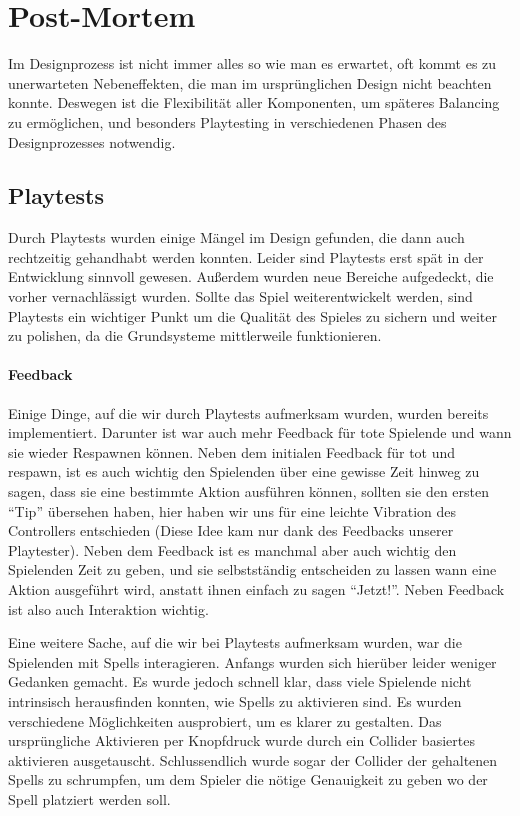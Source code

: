 \chapter{Post-Mortem}

Im Designprozess ist nicht immer alles so wie man es erwartet, oft kommt es zu unerwarteten Nebeneffekten, die man im ursprünglichen Design nicht beachten konnte. Deswegen ist die Flexibilität aller Komponenten, um späteres Balancing zu ermöglichen, und besonders Playtesting in verschiedenen Phasen des Designprozesses notwendig.

\section{Playtests}

Durch Playtests wurden einige Mängel im Design gefunden, die dann auch rechtzeitig gehandhabt werden konnten. Leider sind Playtests erst spät in der Entwicklung sinnvoll gewesen. Außerdem wurden neue Bereiche aufgedeckt, die vorher vernachlässigt wurden. Sollte das Spiel weiterentwickelt werden, sind Playtests ein wichtiger Punkt um die Qualität des Spieles zu sichern und weiter zu polishen, da die Grundsysteme mittlerweile funktionieren.

\subsubsection{Feedback}

Einige Dinge, auf die wir durch Playtests aufmerksam wurden, wurden bereits implementiert. Darunter ist war auch mehr Feedback für tote Spielende und wann sie wieder Respawnen können. Neben dem initialen Feedback für tot und respawn, ist es auch wichtig den Spielenden über eine gewisse Zeit hinweg zu sagen, dass sie eine bestimmte Aktion ausführen können, sollten sie den ersten "`Tip"' übersehen haben, hier haben wir uns für eine leichte Vibration des Controllers entschieden (Diese Idee kam nur dank des Feedbacks unserer Playtester). Neben dem Feedback ist es manchmal aber auch wichtig den Spielenden Zeit zu geben, und sie selbstständig entscheiden zu lassen wann eine Aktion ausgeführt wird, anstatt ihnen einfach zu sagen "`Jetzt!"'. Neben Feedback ist also auch Interaktion wichtig.

Eine weitere Sache, auf die wir bei Playtests aufmerksam wurden, war die Spielenden mit Spells interagieren. Anfangs wurden sich hierüber leider weniger Gedanken gemacht. Es wurde jedoch schnell klar, dass viele Spielende nicht intrinsisch herausfinden konnten, wie Spells zu aktivieren sind. Es wurden verschiedene Möglichkeiten ausprobiert, um es klarer zu gestalten. Das ursprüngliche Aktivieren per Knopfdruck wurde durch ein Collider basiertes aktivieren ausgetauscht. Schlussendlich wurde sogar der Collider der gehaltenen Spells zu schrumpfen, um dem Spieler die nötige Genauigkeit zu geben wo der Spell platziert werden soll.

